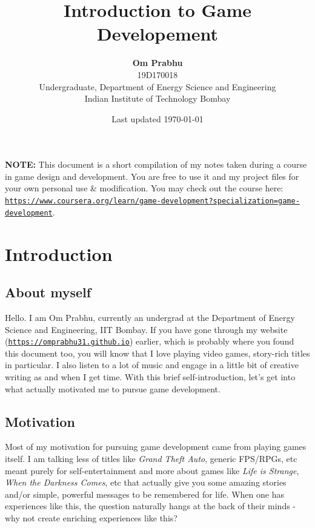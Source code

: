 \documentclass{article}[a4paper,12pt]
\title{\textbf{Introduction to Game Developement}}
\author{
	\textbf{Om Prabhu}\\
	19D170018\\
	Undergraduate, Department of Energy Science and Engineering\\
	Indian Institute of Technology Bombay\\}
\date{Last updated \today}
\theoremstyle{definition}
\begin{document}
\maketitle
\vspace{-12pt}
\hrulefill
\vspace{6pt}

\textbf{NOTE:} This document is a short compilation of my notes taken during a course in game design and development. You are free to use it and my project files for your own personal use \& modification. You may check out the course here: \texttt{\href{https://www.coursera.org/learn/game-development?specialization=game-development}{https://www.coursera.org/learn/game-development?specialization=game-development}}.

\hrulefill
\tableofcontents
\pagebreak

\section{Introduction}
\subsection{About myself}
Hello. I am Om Prabhu, currently an undergrad at the Department of Energy Science and Engineering, IIT Bombay. If you have gone through my website (\texttt{\href{https://omprabhu31.github.io}{https://omprabhu31.github.io}}) earlier, which is probably where you found this document too, you will know that I love playing video games, story-rich titles in particular. I also listen to a lot of music and engage in a little bit of creative writing as and when I get time. With this brief self-introduction, let's get into what actually motivated me to pursue game development.

\subsection{Motivation}
Most of my motivation for pursuing game development came from playing games itself. I am talking less of titles like \textit{Grand Theft Auto}, generic FPS/RPGs, etc meant purely for self-entertainment and more about games like \textit{Life is Strange}, \textit{When the Darkness Comes}, etc that actually give you some amazing stories and/or simple, powerful messages to be remembered for life. When one has experiences like this, the question naturally hangs at the back of their minds - why not create enriching experiences like this?
\vspace{6pt}
\end{document}
